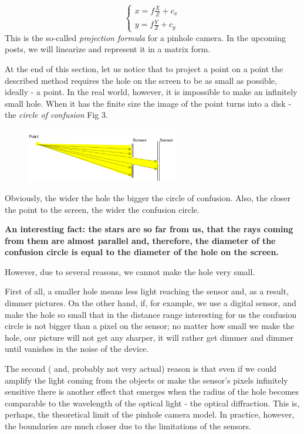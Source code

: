 \documentclass[a4paper,10pt]{article}
\begin{document}
\begin{equation}
\left\{\begin{array}{c}
x = f \frac{X}{Z} + c_x\\ 
y = f \frac{Y}{Z} + c_y
\end{array}\right.\label{projinhmg}
\end{equation}
This is the so-called {\it projection formula} for a pinhole camera. In the upcoming posts, we will linearize and represent it in a matrix form. 

At the end of this section, let us notice that to project a point on a point the described method requires the hole on the screen to be as small as possible, ideally - a point.  In the real world, however, it is impossible to make an infinitely small hole. When it has the finite size the image of the point turns into a disk - the {\it circle of confusion  } Fig 3.
\begin{figure}[h]
\centering
 \includegraphics[width=0.6\textwidth]{../../images/confusion_circle.png}
 \caption{}
\end{figure}

Obviously, the wider the hole the bigger the circle of confusion. Also, the closer the point to the screen, the wider the confusion circle. 

{\bf\tiny An interesting fact: the stars are so far from us, that the rays coming from them are almost parallel and, therefore, the diameter of the confusion circle is equal to the diameter of the hole on the screen.}

However, due to several reasons, we cannot make the hole very small.

First of all, a smaller hole means less light reaching the sensor and, as a result,  dimmer pictures. On the other hand, if, for example,  we use a digital sensor, and make the hole so small that in the distance range interesting for us the confusion circle is not bigger than a pixel on the sensor; no matter how small we make the hole, our picture will not get any sharper, it will rather get dimmer and dimmer until vanishes in the noise of the device.

The second ( and, probably not very actual) reason is that even if we could amplify the light coming from the objects or make the sensor's pixels infinitely sensitive there is another effect that emerges when the radius of the hole becomes comparable to the wavelength of the optical light - the optical diffraction. This is, perhaps, the theoretical limit of the pinhole camera model. In practice, however, the boundaries are much closer due to the limitations of the sensors. 
\end{document}
